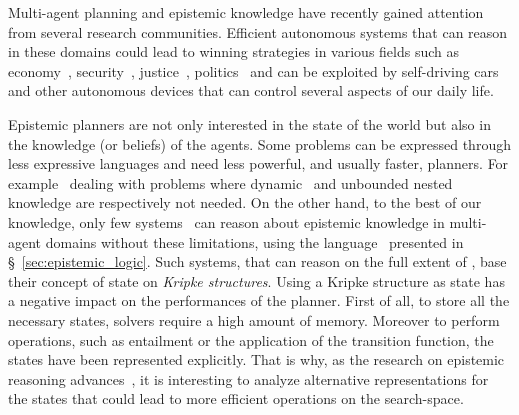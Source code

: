 	Multi-agent planning and epistemic knowledge have recently gained attention from several research communities. 
	Efficient autonomous systems that can reason in these domains could lead to winning strategies in various fields such as economy~\cite{aumann1995epistemic}, security~\cite{Balliu:2011:ETL:2166956.2166962}, justice~\cite{prakken2013logical}, politics~\cite{carbonell1978politics} and can be exploited by self-driving cars and other autonomous devices that can control several aspects	of our daily life.
	
	Epistemic planners are not only interested in the state of the world but also in the knowledge (or beliefs) of the agents.
	Some problems can be expressed through less expressive languages and need less powerful, and usually faster, planners.
	For example~\cite{muise2015planning,huang2017general} dealing with problems where dynamic \emph{\ck}\ and unbounded nested knowledge are  respectively not needed.
	On the other hand, to the best of our knowledge, only few systems~\cite{le2018efp,liu2018multi} can reason about epistemic knowledge in multi-agent domains without these limitations, \ie using the language \lagC\ presented in \S~\ref{sec:epistemic_logic}.
	Such systems, that can reason on the full extent of \lagC, base their concept of state on \emph{Kripke structures}.
	Using a Kripke structure as state has a negative impact on the performances of the planner.
	First of all, to store all the necessary states, solvers require a high amount of memory.
	Moreover to perform operations, such as entailment or the application of the transition function, the states have been represented explicitly. %
	That is why, as the research on epistemic reasoning advances~\cite{baral2015action,aucher2013undecidability,bolander2015complexity}, it is interesting to analyze alternative representations for the states that could lead to more efficient operations on the search-space.
	
